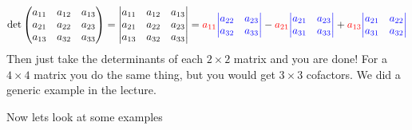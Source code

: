 \documentclass[reqno]{amsart}
\theoremstyle{definition}
\begin{document}
\begin{equation}
\det \begin{pmatrix}
a_{11} & a_{12} & a_{13}\\
a_{21} & a_{22} & a_{23}\\
a_{13} & a_{32} & a_{33}
\end{pmatrix} = \begin{vmatrix}
a_{11} & a_{12} & a_{13}\\
a_{21} & a_{22} & a_{23}\\
a_{13} & a_{32} & a_{33}
\end{vmatrix} = {\color{red}a_{11}}{\color{blue}\begin{vmatrix}
a_{22} & a_{23}\\
a_{32} & a_{33}
\end{vmatrix}}
-  {\color{red}a_{21}}{\color{blue}\begin{vmatrix}
a_{21} & a_{23}\\
a_{31} & a_{33}
\end{vmatrix}} + {\color{red}a_{13}}{\color{blue}\begin{vmatrix}
a_{21} & a_{22}\\
a_{31} & a_{32}
\end{vmatrix}}
\end{equation}
%
Then just take the determinants of each $2 \times 2$ matrix and you are done!
For a $4 \times 4$ matrix you do the same thing, but you would get $3 \times 3$ cofactors.
We did a generic example in the lecture.

Now lets look at some examples
\end{document}
